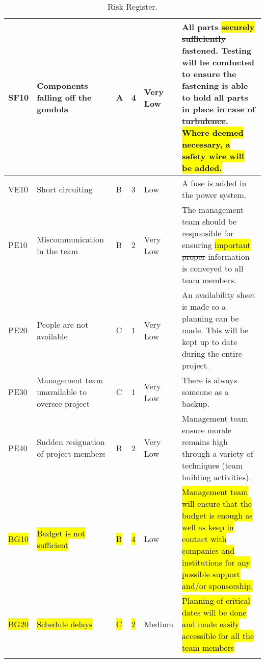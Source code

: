 \begin{longtable}{|m{}| m{} |m{} |m{}|m{}| m{}|}
SF10 & Components falling off the gondola									& A & 4 & \cellcolor[HTML]{34FF34}Very Low	& All parts \hl{securely} \st{sufficiently} fastened. Testing will be conducted to ensure the fastening is able to hold all parts in place \st{in case of turbulence}. \hl{Where deemed necessary, a safety wire will be added.}\\\hline

VE10 & Short circuiting														& B & 3 & \cellcolor[HTML]{FCFF2F}Low			& A fuse is added in the power system.\\\hline

PE10 & Miscommunication in the team											& B & 2 & \cellcolor[HTML]{34FF34}Very Low	& The management team should be responsible for ensuring \hl{important} \st{proper} information is conveyed to all team members.\\\hline

PE20 & People are not available												& C & 1 & \cellcolor[HTML]{34FF34}Very Low	& An availability sheet is made so a planning can be made. This will be kept up to date during the entire project.\\\hline

PE30 & Management team unavailable to oversee project						& C & 1 & \cellcolor[HTML]{34FF34}Very Low	& There is always someone as a backup.\\\hline

PE40 & Sudden resignation of project members								& B & 2 & \cellcolor[HTML]{34FF34}Very Low	& Management team ensure morale remains high through a variety of techniques (team building activities).\\\hline

\hl{BG10} & \hl{Budget is not sufficient} & \hl{B} & \hl{4} & \cellcolor[HTML]{FCFF2F}Low & \hl{Management team will ensure that the budget is enough as well as keep in contact with companies and institutions for any possible support and/or sponsorship.} \\ \hline

\hl{BG20} & \hl{Schedule delays} & \hl{C} & \hl{2} & \cellcolor[HTML]{F39C12} Medium & \hl{Planning of critical dates will be done and made easily accessible for all the team members} \\ \hline



\caption{Risk Register.}
\label{tab:risk-register}
\end{longtable}
\raggedbottom